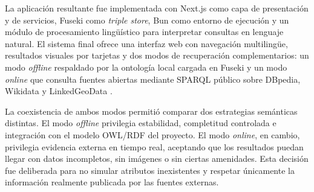 La aplicación resultante fue implementada con Next.js como capa de presentación y de
servicios, Fuseki como \textit{triple store}, Bun como entorno de ejecución y un módulo
de procesamiento lingüístico para interpretar consultas en lenguaje natural. El sistema
final ofrece una interfaz web con navegación multilingüe, resultados visuales por
tarjetas y dos modos de recuperación complementarios: un modo \textit{offline}
respaldado por la ontología local cargada en Fuseki y un modo \textit{online} que
consulta fuentes abiertas mediante SPARQL público sobre DBpedia, Wikidata y
LinkedGeoData \parencite{wikidata,linkedgeodata}.

La coexistencia de ambos modos permitió comparar dos estrategias semánticas distintas.
El modo \textit{offline} privilegia estabilidad, completitud controlada e integración con
el modelo OWL/RDF del proyecto. El modo \textit{online}, en cambio, privilegia evidencia
externa en tiempo real, aceptando que los resultados puedan llegar con datos incompletos,
sin imágenes o sin ciertas amenidades. Esta decisión fue deliberada para no simular
atributos inexistentes y respetar únicamente la información realmente publicada por las
fuentes externas.
